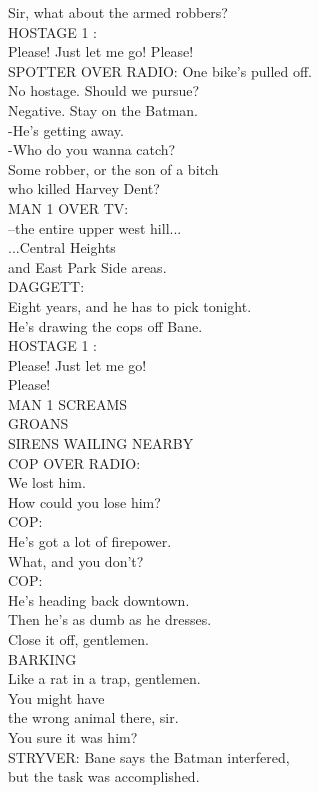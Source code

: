 \documentclass{article}
\begin{document}
\begin{multicols}{3}
Sir, what about the armed robbers?\\
HOSTAGE 1 :\\
Please! Just let me go! Please!\\
SPOTTER OVER RADIO: One bike's pulled off.\\
No hostage. Should we pursue?\\
Negative. Stay on the Batman.\\
-He's getting away.\\
-Who do you wanna catch?\\
Some robber, or the son of a bitch\\
who killed Harvey Dent?\\
MAN 1 OVER TV:\\
--the entire upper west hill...\\
...Central Heights\\
and East Park Side areas.\\
DAGGETT:\\
Eight years, and he has to pick tonight.\\
He's drawing the cops off Bane.\\
HOSTAGE 1 :\\
Please! Just let me go!\\
Please!\\
MAN 1 SCREAMS\\
GROANS\\
SIRENS WAILING NEARBY\\
COP OVER RADIO:\\
We lost him.\\
How could you lose him?\\
COP:\\
He's got a lot of firepower.\\
What, and you don't?\\
COP:\\
He's heading back downtown.\\
Then he's as dumb as he dresses.\\
Close it off, gentlemen.\\
BARKING\\
Like a rat in a trap, gentlemen.\\
You might have\\
the wrong animal there, sir.\\
You sure it was him?\\
STRYVER: Bane says the Batman interfered,\\
but the task was accomplished.\\

\end{multicols}
\end{document}
